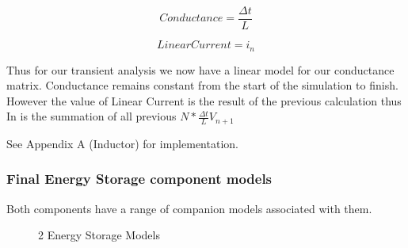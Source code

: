 \documentclass{article}
\begin{document}
\noindent\begin{minipage}{.5\linewidth}
\setcounter{equation}{0}
\begin{equation}
  Conductance = \frac{\Delta t}{L}
\end{equation}
\end{minipage}%
\begin{minipage}{.5\linewidth}
\begin{equation}
  LinearCurrent = i_n
\end{equation}
\end{minipage}

\bigbreak

Thus for our transient analysis we now have a linear model for our conductance matrix. Conductance remains constant from the start of the simulation to finish. However the value of Linear Current is the result of the previous calculation thus In is the summation of all previous $ N * \frac{\Delta t}{L}V_{n+1}$

\bigbreak

See Appendix A (Inductor) for implementation.

\newpage

\subsubsection{Final Energy Storage component models}
Both components have a range of companion models associated with them. 

\begin{figure}[h]%
    \centering
    \qquad
    \caption{2 Energy Storage Models}%
    \label{fig:example}%
\end{figure}
\end{document}
